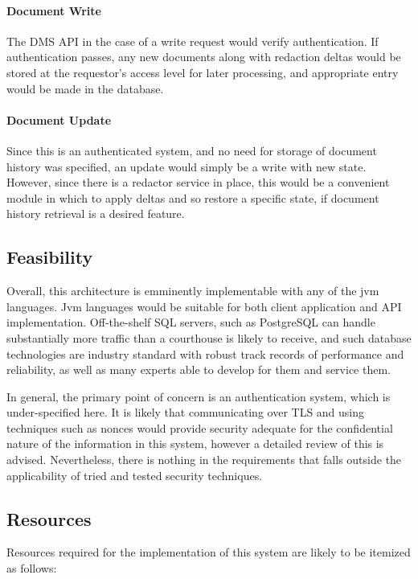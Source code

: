 \paragraph{Document Write}The DMS API in the case of a write request would
verify authentication.  If authentication passes, any new documents along with
redaction deltas would be stored at the requestor's access level for later
processing, and appropriate entry would be made in the database.

\paragraph{Document Update}Since this is an authenticated system, and no need
for storage of document history was specified, an update would simply be a
write with new state.  However, since there is a redactor service in place,
this would be a convenient module in which to apply deltas and so restore a
specific state, if document history retrieval is a desired feature.

\subsection{Feasibility}
Overall, this architecture is emminently implementable with any of the jvm
languages.  Jvm languages would be suitable for both client application and API
implementation.  Off-the-shelf SQL servers, such as PostgreSQL can handle
substantially more traffic than a courthouse is likely to receive, and such
database technologies are industry standard with robust track records of
performance and reliability, as well as many experts able to develop for them
and service them.

In general, the primary point of concern is an authentication system, which is
under-specified here.  It is likely that communicating over TLS and using
techniques such as nonces would provide security adequate for the confidential
nature of the information in this system, however a detailed review of this is
advised.  Nevertheless, there is nothing in the requirements that falls outside
the applicability of tried and tested security techniques.

\subsection{Resources} Resources required for the implementation of this system
are likely to be itemized as follows:

